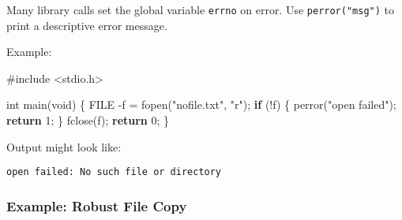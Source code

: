 \documentclass[
  letterpaper,
  DIV=11,
  numbers=noendperiod]{scrreprt}
\newenvironment{Shaded}{\begin{snugshade}}{\end{snugshade}}
\newcommand{\ControlFlowTok}[1]{\textcolor[rgb]{0.00,0.23,0.31}{\textbf{#1}}}
\newcommand{\DataTypeTok}[1]{\textcolor[rgb]{0.68,0.00,0.00}{#1}}
\newcommand{\DecValTok}[1]{\textcolor[rgb]{0.68,0.00,0.00}{#1}}
\newcommand{\ImportTok}[1]{\textcolor[rgb]{0.00,0.46,0.62}{#1}}
\newcommand{\NormalTok}[1]{\textcolor[rgb]{0.00,0.23,0.31}{#1}}
\newcommand{\OperatorTok}[1]{\textcolor[rgb]{0.37,0.37,0.37}{#1}}
\newcommand{\PreprocessorTok}[1]{\textcolor[rgb]{0.68,0.00,0.00}{#1}}
\newcommand{\StringTok}[1]{\textcolor[rgb]{0.13,0.47,0.30}{#1}}
\begin{document}
Many library calls set the global variable \texttt{errno} on error. Use
\texttt{perror("msg")} to print a descriptive error message.

Example:

\begin{Shaded}
\begin{Highlighting}[]
\PreprocessorTok{\#include }\ImportTok{\textless{}stdio.h\textgreater{}}

\DataTypeTok{int}\NormalTok{ main}\OperatorTok{(}\DataTypeTok{void}\OperatorTok{)} \OperatorTok{\{}
    \DataTypeTok{FILE} \OperatorTok{{-}}\NormalTok{f }\OperatorTok{=}\NormalTok{ fopen}\OperatorTok{(}\StringTok{"nofile.txt"}\OperatorTok{,} \StringTok{"r"}\OperatorTok{);}
    \ControlFlowTok{if} \OperatorTok{(!}\NormalTok{f}\OperatorTok{)} \OperatorTok{\{}
\NormalTok{        perror}\OperatorTok{(}\StringTok{"open failed"}\OperatorTok{);}
        \ControlFlowTok{return} \DecValTok{1}\OperatorTok{;}
    \OperatorTok{\}}
\NormalTok{    fclose}\OperatorTok{(}\NormalTok{f}\OperatorTok{);}
    \ControlFlowTok{return} \DecValTok{0}\OperatorTok{;}
\OperatorTok{\}}
\end{Highlighting}
\end{Shaded}

Output might look like:

\begin{verbatim}
open failed: No such file or directory
\end{verbatim}

\subsubsection{Example: Robust File
Copy}\label{example-robust-file-copy}
\end{document}
